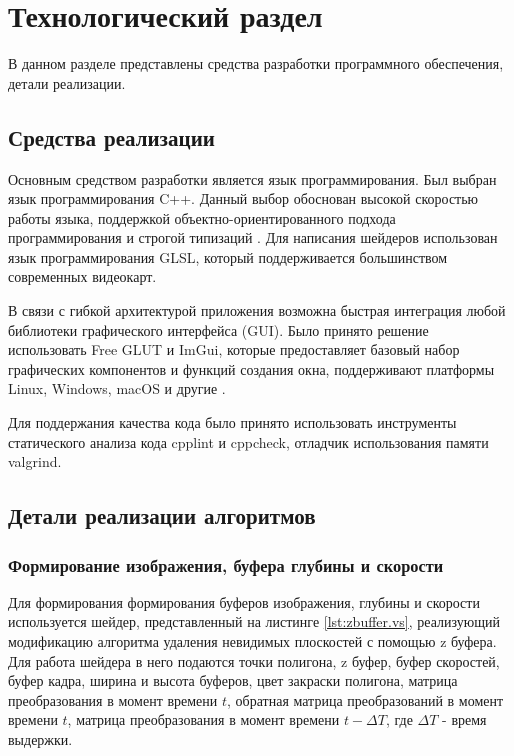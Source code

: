 \chapter{Технологический раздел}
\label{cha:impl}
В данном разделе представлены средства разработки программного
обеспечения, детали реализации.

\section{Средства реализации}

Основным средством разработки является язык программирования. Был выбран язык программирования C++. Данный выбор обоснован высокой скоростью работы языка, поддержкой объектно-ориентированного подхода программирования и строгой типизаций \cite{cpplang}. Для написания шейдеров использован язык программирования GLSL, который поддерживается большинством современных видеокарт.

В связи с гибкой архитектурой приложения возможна быстрая интеграция любой библиотеки графического интерфейса (GUI). Было принято решение использовать Free GLUT и ImGui, которые предоставляет базовый набор графических компонентов и функций создания окна,  поддерживают платформы Linux, Windows, macOS и другие \cite{imgui}. 

Для поддержания качества кода было принято использовать инструменты статического анализа кода cpplint\cite{cpplint} и cppcheck\cite{cppcheck}, отладчик использования памяти valgrind\cite{valgrind}. 

\section{Детали реализации алгоритмов}

\subsection{Формирование изображения, буфера глубины и скорости}

Для формирования формирования буферов изображения, глубины и скорости используется шейдер, представленный на листинге \ref{lst:zbuffer.vs}, реализующий модификацию алгоритма удаления невидимых плоскостей с помощью z буфера. Для работа шейдера в него подаются точки полигона, z буфер, буфер скоростей, буфер кадра, ширина и высота буферов, цвет закраски полигона, матрица преобразования в момент времени $t$, обратная матрица преобразований в момент времени $t$, матрица преобразования в момент времени $t - \Delta T$, где $\Delta T$ - время выдержки.
        

